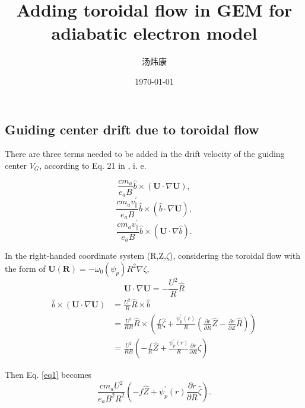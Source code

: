 \documentclass[12pt]{article}
\begin{document}
\begin{CJK*}{UTF8}{gbsn}
\title{\textbf{Adding toroidal flow in GEM for adiabatic electron model}}
\author{汤炜康}
\date{\today}
\maketitle
\tableofcontents
\newpage

\section{Guiding center drift due to toroidal flow}
There are three terms needed to be added in the drift velocity of the guiding center $V_{G}$, 
according to Eq. 21 in \cite{sugama98}, i. e.  

\begin{equation}
    \frac{cm_a}{e_aB}\hat{b} \times (\mathbf{U} \cdot \nabla \mathbf{U}), \label{eq1}
\end{equation}
\begin{equation}
    \frac{cm_av_{\parallel}^{'}}{e_aB} \hat{b} \times (\hat{b} \cdot \nabla \mathbf{U}), \label{eq2}
\end{equation}
\begin{equation}
    \frac{cm_av_{\parallel}^{'}}{e_aB} \hat{b} \times (\mathbf{U} \cdot\nabla\hat{b}). \label{eq3}
\end{equation}

In the right-handed coordinate system (R,Z,$\zeta$), considering the toroidal flow with the form of $\mathbf{U}(\mathbf{R}) = -\omega_0(\psi_p)R^2 \nabla \zeta$,
\begin{equation}
    \mathbf{U} \cdot \nabla \mathbf{U} = - \frac{U^2}{R} \hat{R}
\end{equation}
\begin{equation}
    \begin{split}
        \hat{b} \times (\mathbf{U} \cdot \nabla \mathbf{U}) &= \frac{U^2}{R} \hat{R} \times \hat{b}\\
        &= \frac{U^2}{RB} \hat{R} \times (\frac{f}{R}\hat{\zeta} + \frac{\psi_{p}^{'}(r)}{R}(\frac{\partial r}{\partial R}\hat{Z} - \frac{\partial r}{\partial Z}\hat{R}))\\
        &= \frac{U^2}{RB} (-\frac{f}{R}\hat{Z} + \frac{\psi_{p}^{'}(r)}{R} \frac{\partial r}{\partial R}\hat{\zeta}) \label{eq5}
    \end{split}
\end{equation}

Then Eq. \ref{eq1} becomes  
\begin{equation}
    \frac{cm_aU^2}{e_aB^2R^2}(-f\hat{Z} + \psi_{p}^{'}(r)\frac{\partial r}{\partial R} \hat{\zeta}).
\end{equation}


\end{CJK*}
\end{document}
